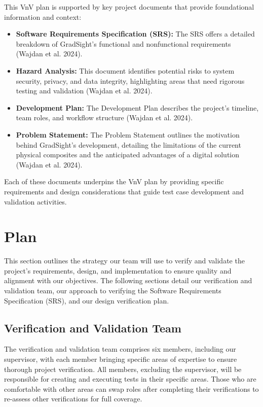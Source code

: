 \documentclass[12pt, titlepage]{article}
\begin{document}
This VnV plan is supported by key project documents that provide foundational information and context:

\begin{itemize}
    \item \textbf{Software Requirements Specification (SRS):} The SRS offers a detailed breakdown of GradSight’s functional and nonfunctional requirements (Wajdan et al. 2024).
    \item \textbf{Hazard Analysis:} This document identifies potential risks to system security, privacy, and data integrity, highlighting areas that need rigorous testing and validation (Wajdan et al. 2024).
    \item \textbf{Development Plan:} The Development Plan describes the project’s timeline, team roles, and workflow structure (Wajdan et al. 2024).
    \item \textbf{Problem Statement:} The Problem Statement outlines the motivation behind GradSight’s development, detailing the limitations of the current physical composites and the anticipated advantages of a digital solution (Wajdan et al. 2024).
\end{itemize}

Each of these documents underpins the VnV plan by providing specific requirements and design considerations that guide test case development and validation activities.




\section{Plan}

This section outlines the strategy our team will use to verify and validate the project’s requirements, design, and implementation to ensure quality and alignment with our objectives. The following sections detail our verification and validation team, our approach to verifying the Software Requirements Specification (SRS), and our design verification plan.

\subsection{Verification and Validation Team}

The verification and validation team comprises six members, including our supervisor, with each member bringing specific areas of expertise to ensure thorough project verification. All members, excluding the supervisor, will be responsible for creating and executing tests in their specific areas. Those who are comfortable with other areas can swap roles after completing their verifications to re-assess other verifications for full coverage.
\end{document}
